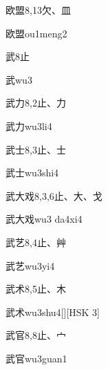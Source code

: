 \begin{entry}{欧盟}{8,13}{⽋、⽫}
  \begin{phonetics}{欧盟}{ou1meng2}
  \end{phonetics}
\end{entry}

\begin{entry}{武}{8}{⽌}
  \begin{phonetics}{武}{wu3}
  \end{phonetics}
\end{entry}

\begin{entry}{武力}{8,2}{⽌、⼒}
  \begin{phonetics}{武力}{wu3li4}
  \end{phonetics}
\end{entry}

\begin{entry}{武士}{8,3}{⽌、⼠}
  \begin{phonetics}{武士}{wu3shi4}
  \end{phonetics}
\end{entry}

\begin{entry}{武大戏}{8,3,6}{⽌、⼤、⼽}
  \begin{phonetics}{武大戏}{wu3 da4xi4}
  \end{phonetics}
\end{entry}

\begin{entry}{武艺}{8,4}{⽌、⾋}
  \begin{phonetics}{武艺}{wu3yi4}
  \end{phonetics}
\end{entry}

\begin{entry}{武术}{8,5}{⽌、⽊}
  \begin{phonetics}{武术}{wu3shu4}[][HSK 3]
  \end{phonetics}
\end{entry}

\begin{entry}{武官}{8,8}{⽌、⼧}
  \begin{phonetics}{武官}{wu3guan1}
  \end{phonetics}
\end{entry}

